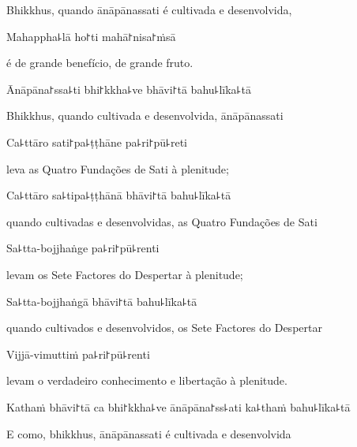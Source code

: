 \begin{english}
  Bhikkhus, quando ānāpānassati é cultivada e desenvolvida,
\end{english}

Mahappha꜕lā ho꜓ti mahā꜓nisa꜓ṁsā

\begin{english}
  é de grande benefício, de grande fruto.
\end{english}

Ānāpāna꜓ssa꜕ti bhi꜓kkha꜕ve bhāvi꜓tā bahu꜕līka꜕tā

\begin{english}
  Bhikkhus, quando cultivada e desenvolvida, ānāpānassati
\end{english}

Ca꜕ttāro sati꜓pa꜕ṭṭhāne pa꜕ri꜓pū꜕reti

\begin{english}
  leva as Quatro Fundações de Sati à plenitude;
\end{english}

Ca꜕ttāro sa꜕tipa꜕ṭṭhānā bhāvi꜓tā bahu꜕līka꜕tā

\begin{english}
  quando cultivadas e desenvolvidas, as Quatro Fundações de Sati
\end{english}

Sa꜕tta-bojjhaṅge pa꜕ri꜓pū꜕renti

\begin{english}
  levam os Sete Factores do Despertar à plenitude;
\end{english}

Sa꜕tta-bojjhaṅgā bhāvi꜓tā bahu꜕līka꜕tā

\begin{english}
  quando cultivados e desenvolvidos, os Sete Factores do Despertar
\end{english}

\enlargethispage{\baselineskip}

Vijjā-vimuttiṁ pa꜕ri꜓pū꜕renti

\begin{english}
  levam o verdadeiro conhecimento e libertação à plenitude.
\end{english}

Kathaṁ bhāvi꜓tā ca bhi꜓kkha꜕ve ānāpāna꜓ss꜕ati ka꜕thaṁ bahu꜕līka꜕tā

\begin{english}
  E como, bhikkhus, ānāpānassati é cultivada e desenvolvida
\end{english}

